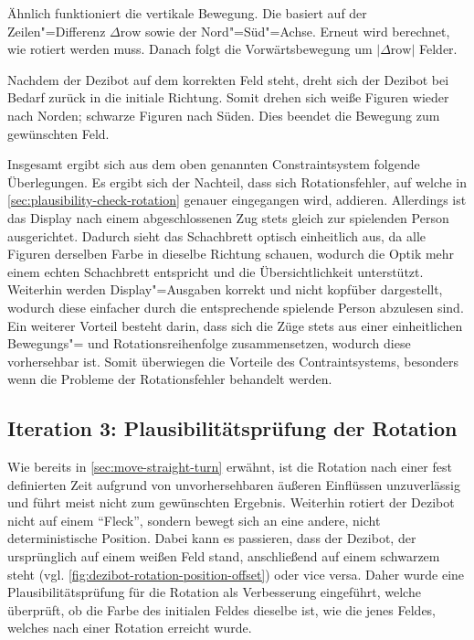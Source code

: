 Ähnlich funktioniert die vertikale Bewegung. Die basiert auf der Zeilen"=Differenz $\Delta\text{row}$ sowie der Nord"=Süd"=Achse. Erneut wird berechnet, wie rotiert werden muss. Danach folgt die Vorwärtsbewegung um $\vert \Delta\text{row} \vert$ Felder.

Nachdem der Dezibot auf dem korrekten Feld steht, dreht sich der Dezibot bei Bedarf zurück in die initiale Richtung. Somit drehen sich weiße Figuren wieder nach Norden; schwarze Figuren nach Süden. Dies beendet die Bewegung zum gewünschten Feld.


Insgesamt ergibt sich aus dem oben genannten Constraintsystem folgende Überlegungen. Es ergibt sich der Nachteil, dass sich Rotationsfehler, auf welche in \autoref{sec:plausibility-check-rotation} genauer eingegangen wird, addieren. Allerdings ist das Display nach einem abgeschlossenen Zug stets gleich zur spielenden Person ausgerichtet. Dadurch sieht das Schachbrett optisch einheitlich aus, da alle Figuren derselben Farbe in dieselbe Richtung schauen, wodurch die Optik mehr einem echten Schachbrett entspricht und die Übersichtlichkeit unterstützt. Weiterhin werden Display"=Ausgaben korrekt und nicht kopfüber dargestellt, wodurch diese einfacher durch die entsprechende spielende Person abzulesen sind. Ein weiterer Vorteil besteht darin, dass sich die Züge stets aus einer einheitlichen Bewegungs"= und Rotationsreihenfolge zusammensetzen, wodurch diese vorhersehbar ist. Somit überwiegen die Vorteile des Contraintsystems, besonders wenn die Probleme der Rotationsfehler behandelt werden.


\subsection{Iteration 3: Plausibilitätsprüfung der Rotation}
\label{sec:plausibility-check-rotation}

Wie bereits in \autoref{sec:move-straight-turn} erwähnt, ist die Rotation nach einer fest definierten Zeit aufgrund von unvorhersehbaren äußeren Einflüssen unzuverlässig und führt meist nicht zum gewünschten Ergebnis. Weiterhin rotiert der Dezibot nicht auf einem \enquote{Fleck}, sondern bewegt sich an eine andere, nicht deterministische Position. Dabei kann es passieren, dass der Dezibot, der ursprünglich auf einem weißen Feld stand, anschließend auf einem schwarzem steht (vgl. \autoref{fig:dezibot-rotation-position-offset}) oder vice versa. Daher wurde eine Plausibilitätsprüfung für die Rotation als Verbesserung eingeführt, welche überprüft, ob die Farbe des initialen Feldes dieselbe ist, wie die jenes Feldes, welches nach einer Rotation erreicht wurde.

